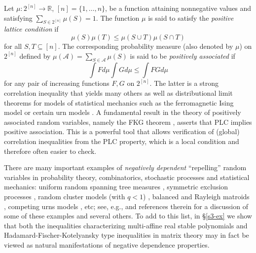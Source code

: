 \documentclass[10pt,reqno]{amsart}
\theoremstyle{plain}
\theoremstyle{definition}
\theoremstyle{remark}
\newcommand{\RR}{\mathbb{R}}
\begin{document}
Let $\mu : 2^{[n]} \rightarrow \RR$, $[n]=\{1,\ldots,n\}$, be a function attaining nonnegative values and satisfying $\sum_{S \in 2^{[n]}}\mu(S)=1$. The function $\mu$ is said to satisfy the 
{\em positive lattice condition} \cite{FKG,P} if 
\begin{equation*}
\mu(S)\mu(T) \leq \mu(S\cup T)\mu(S\cap T)\tag*{(PLC)}
\end{equation*}
for all $S,T \subseteq [n]$. The corresponding probability measure (also denoted by $\mu$) on $2^{[n]}$ defined by $\mu(\mathcal{A})=\sum_{S \in \mathcal{A}}\mu(S)$ is said to be {\em positively associated}
if
$$\int Fd\mu \int Gd\mu \le \int FG d\mu$$
for any pair of increasing functions $F,G$ on $2^{[n]}$. The latter is a
strong correlation inequality that yields many others as well as distributional
limit theorems for models of statistical mechanics such as the ferromagnetic
Ising model or certain urn models \cite{New}. A fundamental result in the
theory of positively associated random variables, 
namely the FKG theorem \cite{FKG},
asserts that PLC implies positive association. This is a powerful tool that
allows verification of (global) correlation inequalities from the PLC
property, which is a local condition and therefore often easier to check.  

There are many important examples of 
{\em negatively dependent} ``repelling'' random
variables in probability theory, combinatorics, stochastic processes and
statistical mechanics: uniform random spanning tree measures \cite{BP}, 
symmetric exclusion processes \cite{L0,L2}, random cluster models 
(with $q<1$) \cite{grimmett,Hag,P},
balanced and Rayleigh matroids \cite{CW,feder,semple-welsh,sok,W}, 
competing urns models \cite{DR}, etc; see, e.g., \cite{J-DP,P} and references 
therein for a discussion of some of these examples and several others. 
To add to this list, in \S \ref{s3-ex} we show that both the inequalities 
characterizing multi-affine real 
stable polynomials \cite{BBS1,BBS2,PB} and Hadamard-Fischer-Kotelyansky type
inequalities in matrix theory \cite{FJ,HS,HM} may in fact be viewed as natural
manifestations of negative dependence properties.
\end{document}
